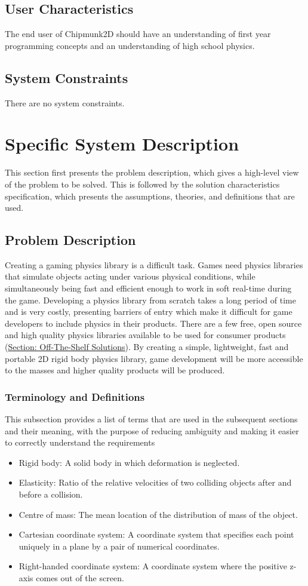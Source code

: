 \documentclass[12pt]{article}
\begin{document}
\subsection{User Characteristics}
\label{Sec:UserChars}
The end user of Chipmunk2D should have an understanding of first year programming concepts and an understanding of high school physics.
\subsection{System Constraints}
\label{Sec:SysConstraints}
There are no system constraints.
\section{Specific System Description}
\label{Sec:SpecSystDesc}
This section first presents the problem description, which gives a high-level view of the problem to be solved. This is followed by the solution characteristics specification, which presents the assumptions, theories, and definitions that are used.
\subsection{Problem Description}
\label{Sec:ProbDesc}
Creating a gaming physics library is a difficult task. Games need physics libraries that simulate objects acting under various physical conditions, while simultaneously being fast and efficient enough to work in soft real-time during the game. Developing a physics library from scratch takes a long period of time and is very costly, presenting barriers of entry which make it difficult for game developers to include physics in their products. There are a few free, open source and high quality physics libraries available to be used for consumer products (\hyperref[Sec:ExistingSolns]{Section: Off-The-Shelf Solutions}). By creating a simple, lightweight, fast and portable 2D rigid body physics library, game development will be more accessible to the masses and higher quality products will be produced.
\subsubsection{Terminology and Definitions}
\label{Sec:TermDefs}
This subsection provides a list of terms that are used in the subsequent sections and their meaning, with the purpose of reducing ambiguity and making it easier to correctly understand the requirements
\begin{itemize}
\item{Rigid body: A solid body in which deformation is neglected.}
\item{Elasticity: Ratio of the relative velocities of two colliding objects after and before a collision.}
\item{Centre of mass: The mean location of the distribution of mass of the object.}
\item{Cartesian coordinate system: A coordinate system that specifies each point uniquely in a plane by a pair of numerical coordinates.}
\item{Right-handed coordinate system: A coordinate system where the positive z-axis comes out of the screen.}
\end{itemize}
\end{document}
